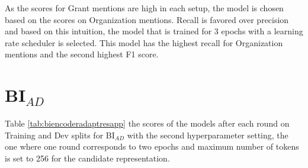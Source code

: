 \documentclass{report}
\theoremstyle{definition}
\theoremstyle{remark}
\begin{document}
As the scores for Grant mentions are high in each setup, the model is chosen based on the scores on Organization mentions. Recall is favored over precision and based on this intuition, the model that is trained for 3 epochs with a learning rate scheduler is selected. This model has the highest recall for Organization mentions and the second highest F1 score. 

\section{BI$_{AD}$}
\label{sec:app:biencoderadapt}
Table \ref{tab:biencoderadaptresapp} the scores of the models after each round on Training and Dev splits for BI$_{AD}$ with the second hyperparameter setting, the one where one round corresponds to two epochs and maximum number of tokens is set to 256 for the candidate representation.
\newpage
\end{document}
